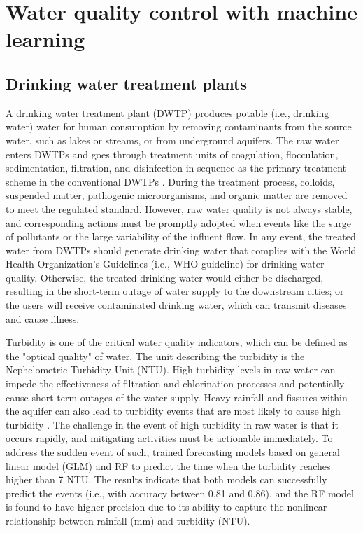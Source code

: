 \section{Water quality control with machine learning}
\subsection{Drinking water treatment plants}
A drinking water treatment plant (DWTP) produces potable (i.e., drinking water) water for human consumption by removing contaminants from the source water, such as lakes or streams, or from underground aquifers. The raw water enters DWTPs and goes through treatment units of coagulation, flocculation, sedimentation, filtration, and disinfection in sequence as the primary treatment scheme in the conventional DWTPs \citep{liRecentAdvancesArtificial2021}. During the treatment process, colloids, suspended matter, pathogenic microorganisms, and organic matter are removed to meet the regulated standard. However, raw water quality is not always stable, and corresponding actions must be promptly adopted when events like the surge of pollutants or the large variability of the influent flow. In any event, the treated water from DWTPs should generate drinking water that complies with the World Health Organization's Guidelines (i.e., WHO guideline) for drinking water quality. Otherwise, the treated drinking water would either be discharged,  resulting in the short-term outage of water supply to the downstream cities; or the users will receive contaminated drinking water, which can transmit diseases and cause illness.


Turbidity is one of the critical water quality indicators, which can be defined as the "optical quality" of water. The unit describing the turbidity is the Nephelometric Turbidity Unit (NTU). High turbidity levels in raw water can impede the effectiveness of filtration and chlorination processes and potentially cause short-term outages of the water supply. Heavy rainfall and fissures within the aquifer can also lead to turbidity events that are most likely to cause high turbidity \citep{worldhealthorganizationWaterQualityHealth2017}. The challenge in the event of high turbidity in raw water is that it occurs rapidly, and mitigating activities must be actionable immediately. To address the sudden event of such, \citet{stevensonAdvancedTurbidityPrediction2019} trained forecasting models based on general linear model (GLM) and RF to predict the time when the turbidity reaches higher than 7 NTU. The results indicate that both models can successfully predict the events (i.e., with accuracy between 0.81 and 0.86), and the RF model is found to have higher precision due to its ability to capture the nonlinear relationship between rainfall (mm) and turbidity (NTU).

